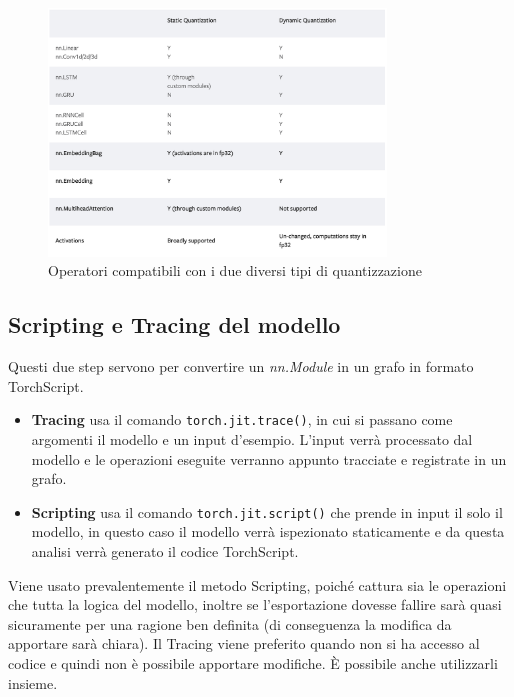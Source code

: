 \begin{figure}
    \centering
    \includegraphics[width=0.8\textwidth]{Immagini/operator coverage.png}
    \caption{Operatori compatibili con i due diversi tipi di quantizzazione}
    \label{fig:quantizationCoverage}
\end{figure}
    
\subsection{Scripting e Tracing del modello}
Questi due step\cite{TracingVSScripting} servono per convertire un \textit{nn.Module} in un grafo in formato TorchScript.
\begin{itemize}
    \item \textbf{Tracing} usa il comando \texttt{torch.jit.trace()}, in cui si passano come argomenti il modello e un input d'esempio. L'input verrà processato
    dal modello e le operazioni eseguite verranno appunto tracciate e registrate in un grafo.
    \item \textbf{Scripting} usa il comando \texttt{torch.jit.script()} che prende in input il solo il modello, in questo caso il modello verrà ispezionato
    staticamente e da questa analisi verrà generato il codice TorchScript.
\end{itemize}
Viene usato prevalentemente il metodo Scripting, poiché cattura sia le operazioni che tutta la logica del modello, inoltre se l'esportazione dovesse fallire sarà
quasi sicuramente per una ragione ben definita (di conseguenza la modifica da apportare sarà chiara). Il Tracing viene preferito quando non si ha accesso al codice
e quindi non è possibile apportare modifiche. È possibile anche utilizzarli insieme.

